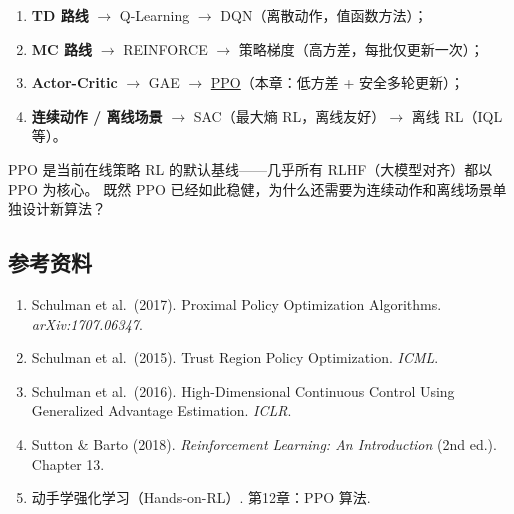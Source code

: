 \documentclass{article}
\begin{document}
\begin{enumerate}
  \item \textbf{TD 路线} $\to$ Q-Learning $\to$ DQN（离散动作，值函数方法）；
  \item \textbf{MC 路线} $\to$ REINFORCE $\to$ 策略梯度（高方差，每批仅更新一次）；
  \item \textbf{Actor-Critic} $\to$ GAE $\to$ \underline{PPO}（本章：低方差 + 安全多轮更新）；
  \item \textbf{连续动作 / 离线场景} $\to$ SAC（最大熵 RL，离线友好）$\to$ 离线 RL（IQL 等）。
\end{enumerate}

PPO 是当前在线策略 RL 的默认基线——几乎所有 RLHF（大模型对齐）都以 PPO 为核心。
既然 PPO 已经如此稳健，为什么还需要为连续动作和离线场景单独设计新算法？

\subsection*{参考资料}

\begin{enumerate}
  \item Schulman et al.\ (2017). Proximal Policy Optimization Algorithms. \textit{arXiv:1707.06347}.
  \item Schulman et al.\ (2015). Trust Region Policy Optimization. \textit{ICML}.
  \item Schulman et al.\ (2016). High-Dimensional Continuous Control Using Generalized Advantage Estimation. \textit{ICLR}.
  \item Sutton \& Barto (2018). \textit{Reinforcement Learning: An Introduction} (2nd ed.). Chapter 13.
  \item 动手学强化学习（Hands-on-RL）. 第12章：PPO 算法.
\end{enumerate}
\end{document}
